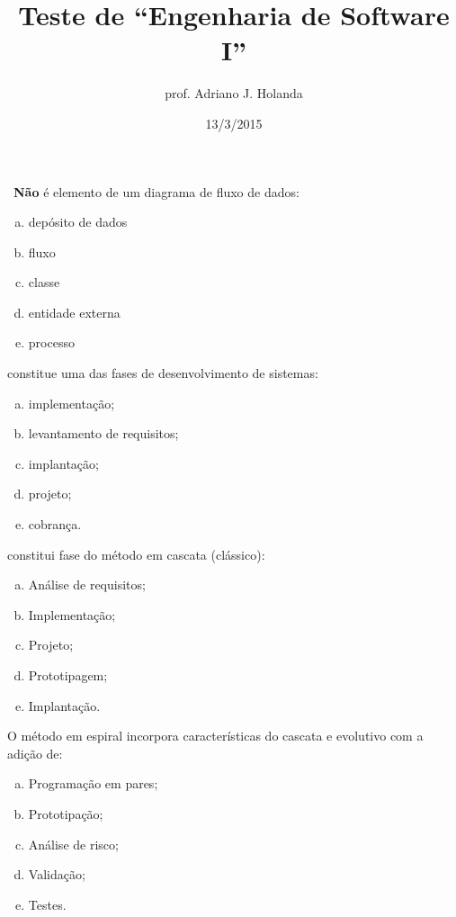 

\title{Teste de ``Engenharia de Software I''}
\author{prof. Adriano J. Holanda}
\date{13/3/2015}




\quiz~{\bf Não} é elemento de um diagrama de fluxo de dados:

\begin{enumerate}[a)]
\item depósito de dados
\item fluxo
\item classe
\item entidade externa
\item processo
\end{enumerate}




 constitue uma das fases de desenvolvimento de sistemas:

\begin{enumerate}[a)]
\item implementação;
\item levantamento de requisitos;
\item implantação;
\item projeto;
\item cobrança.
\end{enumerate}

 constitui fase do método em cascata (clássico):

\begin{enumerate}[a)]
\item Análise de requisitos;
\item Implementação;
\item Projeto;
\item Prototipagem;
\item Implantação.
\end{enumerate}

\quiz O método em espiral incorpora características do cascata e evolutivo com 
a adição de:

\begin{enumerate}[a)]
\item Programação em pares;
\item Prototipação;
\item Análise de risco;
\item Validação;
\item Testes.
\end{enumerate}


